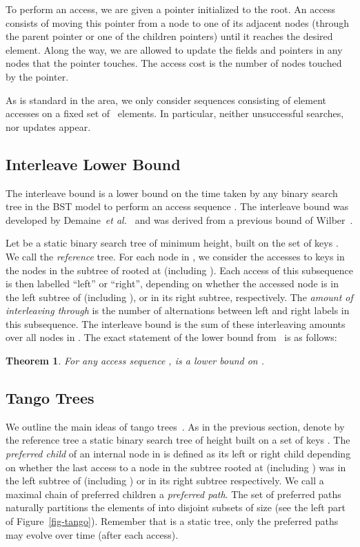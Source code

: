 \documentclass[letterpaper,11pt]{article}
\newtheorem{thm}{Theorem}
\begin{document}
To perform an access, we are given a pointer initialized to the root. An access
consists of moving this pointer from a node to one of its adjacent nodes
(through the parent pointer or one of the children pointers) until it reaches
the desired element. Along the way, we are allowed to update the fields and
pointers in any nodes that the pointer touches. The access cost is the number
of nodes touched by the pointer.  

As is standard in the area, we only consider sequences consisting of element
accesses on a fixed set  of ~elements. In particular, neither
unsuccessful searches, nor updates appear.

\subsection{Interleave Lower Bound}
The interleave bound is a lower bound on the time taken by any binary
search tree in the BST model to perform an access sequence
. The interleave bound was developed by
Demaine~\emph{et al.}~\cite{tango} and was derived from a previous bound of
Wilber~\cite{wilber}.

Let  be a static binary search tree of minimum height, built on the set
of keys . We call  the \emph{reference} tree. For each node  in
, we consider the accesses  to keys in the nodes in the subtree of
 rooted at  (including ). Each access of this subsequence is then
labelled ``left'' or ``right'', depending on whether the accessed node is
in the left subtree of  (including ), or in its right subtree,
respectively. The \emph{amount of interleaving through } is the number
of alternations between left and right labels in this subsequence. The
interleave bound  is the sum of these interleaving amounts
over all nodes  in .
The exact statement of the lower bound from~\cite{tango} is as follows:
\begin{thm}
\label{ib}
For any access sequence , 
 is a lower bound on .
\end{thm}

\subsection{Tango Trees}
We outline the main ideas of tango trees~\cite{tango}.
As in the previous section, denote by the reference tree  a static
binary search tree of height  built on a set of keys . The
\emph{preferred child} of an internal node  in  is defined as its
left or right child depending on whether the last access to a node in the
subtree rooted at  (including ) was in the left subtree of 
(including ) or in its right subtree respectively. We call a maximal
chain of preferred children a \emph{preferred path}. The set of preferred
paths naturally partitions the elements of  into disjoint subsets of
size  (see the left part of Figure~\ref{fig-tango}). Remember
that  is a static tree, only the preferred paths may evolve over time
(after each access).
\end{document}

